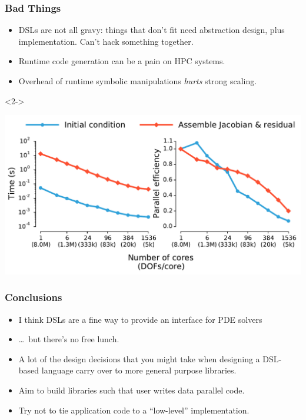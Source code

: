 \documentclass[presentation]{beamer}
\begin{document}
\begin{frame}
  \frametitle{Bad Things}
  \begin{itemize}
  \item DSLs are not all gravy: things that don't fit need abstraction
    design, plus implementation.  Can't hack something together.
  \item Runtime code generation can be a pain on HPC systems.
  \item Overhead of runtime symbolic manipulations \emph{hurts} strong
    scaling.
  \end{itemize}
  \begin{uncoverenv}<2->
    \begin{center}
      \includegraphics[height=0.75\textheight]{09-03-ParCo-firedrake-overview.figures/strong-scaling}
    \end{center}
  \end{uncoverenv}
\end{frame}

\begin{frame}
  \frametitle{Conclusions}
  \begin{itemize}
  \item I think DSLs are a fine way to provide an interface for PDE
    solvers
  \item \ldots\ but there's no free lunch.
  \item A lot of the design decisions that you might take when
    designing a DSL-based language carry over to more general purpose
    libraries.
  \item Aim to build libraries such that user
    writes data parallel code.
  \item Try not to tie application code to a ``low-level'' implementation.
  \end{itemize}
\end{frame}
\end{document}
